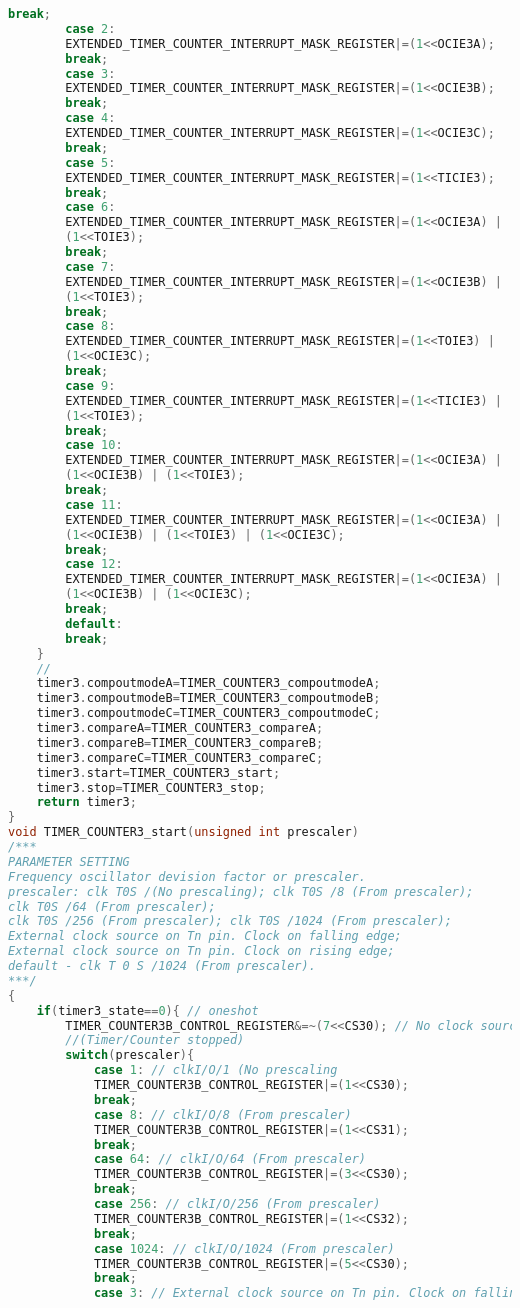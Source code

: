 \begin{lstlisting}[language=C]
		break;
		case 2:
		EXTENDED_TIMER_COUNTER_INTERRUPT_MASK_REGISTER|=(1<<OCIE3A);
		break;
		case 3:
		EXTENDED_TIMER_COUNTER_INTERRUPT_MASK_REGISTER|=(1<<OCIE3B);
		break;
		case 4:
		EXTENDED_TIMER_COUNTER_INTERRUPT_MASK_REGISTER|=(1<<OCIE3C);
		break;
		case 5:
		EXTENDED_TIMER_COUNTER_INTERRUPT_MASK_REGISTER|=(1<<TICIE3);
		break;
		case 6:
		EXTENDED_TIMER_COUNTER_INTERRUPT_MASK_REGISTER|=(1<<OCIE3A) |
		(1<<TOIE3);
		break;
		case 7:
		EXTENDED_TIMER_COUNTER_INTERRUPT_MASK_REGISTER|=(1<<OCIE3B) |
		(1<<TOIE3);
		break;
		case 8:
		EXTENDED_TIMER_COUNTER_INTERRUPT_MASK_REGISTER|=(1<<TOIE3) |
		(1<<OCIE3C);
		break;
		case 9:
		EXTENDED_TIMER_COUNTER_INTERRUPT_MASK_REGISTER|=(1<<TICIE3) |
		(1<<TOIE3);
		break;
		case 10:
		EXTENDED_TIMER_COUNTER_INTERRUPT_MASK_REGISTER|=(1<<OCIE3A) |
		(1<<OCIE3B) | (1<<TOIE3);
		break;
		case 11:
		EXTENDED_TIMER_COUNTER_INTERRUPT_MASK_REGISTER|=(1<<OCIE3A) |
		(1<<OCIE3B) | (1<<TOIE3) | (1<<OCIE3C);
		break;
		case 12:
		EXTENDED_TIMER_COUNTER_INTERRUPT_MASK_REGISTER|=(1<<OCIE3A) |
		(1<<OCIE3B) | (1<<OCIE3C);
		break;
		default:
		break;
	}
	//
	timer3.compoutmodeA=TIMER_COUNTER3_compoutmodeA;
	timer3.compoutmodeB=TIMER_COUNTER3_compoutmodeB;
	timer3.compoutmodeC=TIMER_COUNTER3_compoutmodeC;
	timer3.compareA=TIMER_COUNTER3_compareA;
	timer3.compareB=TIMER_COUNTER3_compareB;
	timer3.compareC=TIMER_COUNTER3_compareC;
	timer3.start=TIMER_COUNTER3_start;
	timer3.stop=TIMER_COUNTER3_stop;
	return timer3;
}
void TIMER_COUNTER3_start(unsigned int prescaler)
/***
PARAMETER SETTING
Frequency oscillator devision factor or prescaler.
prescaler: clk T0S /(No prescaling); clk T0S /8 (From prescaler);
clk T0S /64 (From prescaler);
clk T0S /256 (From prescaler); clk T0S /1024 (From prescaler);
External clock source on Tn pin. Clock on falling edge;
External clock source on Tn pin. Clock on rising edge;
default - clk T 0 S /1024 (From prescaler).
***/
{
	if(timer3_state==0){ // oneshot
		TIMER_COUNTER3B_CONTROL_REGISTER&=~(7<<CS30); // No clock source.
		//(Timer/Counter stopped)
		switch(prescaler){
			case 1: // clkI/O/1 (No prescaling
			TIMER_COUNTER3B_CONTROL_REGISTER|=(1<<CS30);
			break;
			case 8: // clkI/O/8 (From prescaler)
			TIMER_COUNTER3B_CONTROL_REGISTER|=(1<<CS31);
			break;
			case 64: // clkI/O/64 (From prescaler)
			TIMER_COUNTER3B_CONTROL_REGISTER|=(3<<CS30);
			break;
			case 256: // clkI/O/256 (From prescaler)
			TIMER_COUNTER3B_CONTROL_REGISTER|=(1<<CS32);
			break;
			case 1024: // clkI/O/1024 (From prescaler)
			TIMER_COUNTER3B_CONTROL_REGISTER|=(5<<CS30);
			break;
			case 3: // External clock source on Tn pin. Clock on falling edge

\end{lstlisting}
